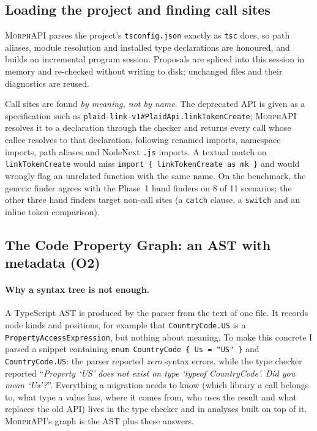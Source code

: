 \documentclass[11pt,a4paper]{article}
\newcommand{\code}[1]{\texttt{#1}}
\newcommand{\morph}{\textsc{MorphAPI}}
\begin{document}
\subsection{Loading the project and finding call sites}

\morph{} parses the project's \code{tsconfig.json} exactly as \code{tsc} does, so path
aliases, module resolution and installed type declarations are honoured, and builds an
incremental program session. Proposals are spliced into this session in memory and
re-checked without writing to disk; unchanged files and their diagnostics are reused.

Call sites are found \emph{by meaning, not by name}. The deprecated API is given as a
specification such as \code{plaid-link-v1\#PlaidApi.linkTokenCreate}; \morph{} resolves it
to a declaration through the checker and returns every call whose callee resolves to that
declaration, following renamed imports, namespace imports, path aliases and NodeNext
\code{.js} imports. A textual match on \code{linkTokenCreate} would miss
\code{import \{ linkTokenCreate as mk \}} and would wrongly flag an unrelated function
with the same name. On the benchmark, the generic finder agrees with the Phase~1 hand
finders on 8 of 11 scenarios; the other three hand finders target non-call sites (a
\code{catch} clause, a \code{switch} and an inline token comparison).

\subsection{The Code Property Graph: an AST with metadata (O2)}
\label{sec:cpg}

\paragraph{Why a syntax tree is not enough.}
A TypeScript AST is produced by the parser from the text of one file. It records node
kinds and positions, for example that \code{CountryCode.US} is a
\code{PropertyAccessExpression}, but nothing about meaning. To make this concrete I parsed a
snippet containing \code{enum CountryCode \{ Us = "US" \}} and \code{CountryCode.US}: the
parser reported \emph{zero} syntax errors, while the type checker reported
``\textit{Property `US' does not exist on type `typeof CountryCode'. Did you mean `Us'?}''.
Everything a migration needs to know (which library a call belongs to, what type a value has,
where it comes from, who uses the result and what replaces the old API) lives in the type
checker and in analyses built on top of it. \morph{}'s graph is the AST plus these answers.
\end{document}
